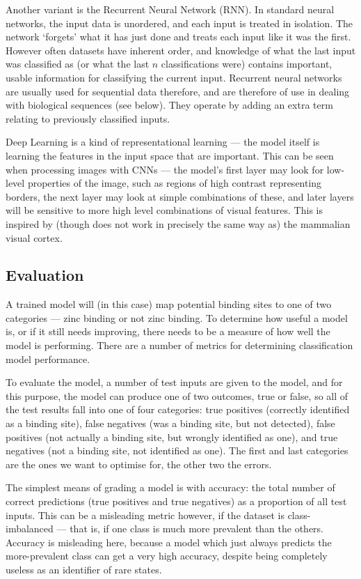Another variant is the Recurrent Neural Network (RNN). In standard neural networks, the input data is unordered, and each input is treated in isolation. The network `forgets' what it has just done and treats each input like it was the first. However often datasets have inherent order, and knowledge of what the last input was classified as (or what the last $n$ classifications were) contains important, usable information for classifying the current input. Recurrent neural networks are usually used for sequential data therefore, and are therefore of use in dealing with biological sequences (see below). They operate by adding an extra term relating to previously classified inputs.

Deep Learning is a kind of representational learning --- the model itself is learning the features in the input space that are important. This can be seen when processing images with CNNs --- the model's first layer may look for low-level properties of the image, such as regions of high contrast representing borders, the next layer may look at simple combinations of these, and later layers will be sensitive to more high level combinations of visual features. This is inspired by (though does not work in precisely the same way as) the mammalian visual cortex.

\subsection{Evaluation}

A trained model will (in this case) map potential binding sites to one of two categories --- zinc binding or not zinc binding. To determine how useful a model is, or if it still needs improving, there needs to be a measure of how well the model is performing. There are a number of metrics for determining classification model performance.

To evaluate the model, a number of test inputs are given to the model, and for this purpose, the model can produce one of two outcomes, true or false, so all of the test results fall into one of four categories: true positives (correctly identified as a binding site), false negatives (was a binding site, but not detected), false positives (not actually a binding site, but wrongly identified as one), and true negatives (not a binding site, not identified as one). The first and last categories are the ones we want to optimise for, the other two the errors.

The simplest means of grading a model is with accuracy: the total number of correct predictions (true positives and true negatives) as a proportion of all test inputs. This can be a misleading metric however, if the dataset is class-imbalanced --- that is, if one class is much more prevalent than the others. Accuracy is misleading here, because a model which just always predicts the more-prevalent class can get a very high accuracy, despite being completely useless as an identifier of rare states.

